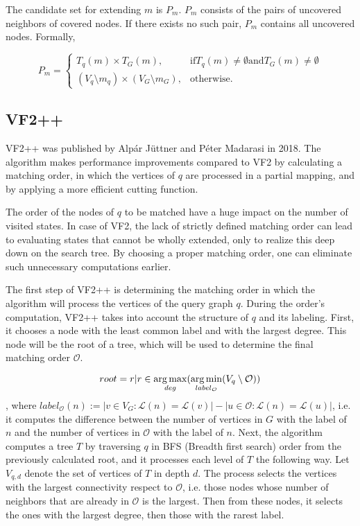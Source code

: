 The candidate set for extending $m$ is $P_m$. $P_m$ consists of the pairs of uncovered neighbors
of covered nodes. If there exists no such pair, $P_m$ contains all uncovered nodes. Formally,

\[
    P_m = 
\begin{cases}
    T_q(m) \times T_G(m),& \text{if} T_q(m) \neq \emptyset \text{and} T_G(m) \neq \emptyset\\
    (V_q \setminus m_q) \times (V_G \setminus m_G),  & \text{otherwise}.
\end{cases}    
\]


\subsection{VF2++}

VF2++  was published by Alp\'{a}r J\"{u}ttner and P\'{e}ter Madarasi in 2018.
The algorithm makes performance improvements compared to VF2 by calculating a matching
order, in which the vertices of $q$ are processed in a partial mapping, and by applying
a more efficient cutting function.

The order of the nodes of $q$ to be matched have a huge impact on the number of visited
states. In case of VF2, the lack of strictly defined matching order can lead to evaluating
states that cannot be wholly extended, only to realize this deep down on the search tree.
By choosing a proper matching order, one can eliminate such unnecessary computations earlier.


The first step of VF2++ is determining the matching order in which the algorithm will process
the vertices of the query graph $q$. During the order's computation, VF2++ takes into account
the structure of $q$ and its labeling. First, it chooses a node with the least common label 
and with the largest degree. This node will be the root of a tree, which will be used to determine
the final matching order $\mathcal{O}$.


\[ root = {r | r \in \operatorname*{arg\,max}_{deg}(\operatorname*{arg\,min}_{label_{\mathcal{O}}}(V_q \setminus \mathcal{O}))} \]
, where $label_{\mathcal{O}}(n) := |{v \in V_G : \mathcal{L}(n) = \mathcal{L}(v)}| - |{u \in \mathcal{O}: \mathcal{L}(n) = \mathcal{L}(u)}|$, 
i.e. it computes the difference between the number of vertices in $G$ with the label of $n$ and 
the number of vertices in $\mathcal{O}$ with the label of $n$. Next, the algorithm computes a tree 
$T$ by traversing $q$ in BFS (Breadth first search) order from the previously calculated root, and
it processes each level of $T$ the following way. Let $V_{q,d}$ denote the set of vertices of $T$ in
depth $d$. The process selects the vertices with the largest connectivity respect to $\mathcal{O}$,
i.e. those nodes whose number of neighbors that are already in $\mathcal{O}$ is the largest. Then
from these nodes, it selects the ones with the largest degree, then those with the rarest label.

